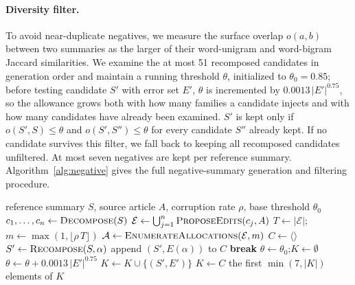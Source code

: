 \documentclass[11pt]{article}
\begin{document}
\paragraph{Diversity filter.}
To avoid near-duplicate negatives, we measure the surface overlap $o(a,b)$ between two summaries as the larger of their word-unigram and word-bigram Jaccard similarities. We examine the at most 51 recomposed candidates in generation order and maintain a running threshold $\theta$, initialized to $\theta_0=0.85$; before testing candidate $S'$ with error set $E'$, $\theta$ is incremented by $0.0013\,|E'|^{0.75}$, so the allowance grows both with how many families a candidate injects and with how many candidates have already been examined. $S'$ is kept only if $o(S',S)\le\theta$ and $o(S',S'')\le\theta$ for every candidate $S''$ already kept. If no candidate survives this filter, we fall back to keeping all recomposed candidates unfiltered. At most seven negatives are kept per reference summary. Algorithm~\ref{alg:negative} gives the full negative-summary generation and filtering procedure.

\begin{algorithm}[t]
\caption{Negative summary generation and diversity filtering}
\label{alg:negative}
\begin{algorithmic}[1]
\Require reference summary $S$, source article $A$, corruption rate $\rho$, base threshold $\theta_0$
\State $c_1,\dots,c_n \gets \textsc{Decompose}(S)$ 
\State $\mathcal{E} \gets \bigcup_{j=1}^{n} \textsc{ProposeEdits}(c_j, A)$ 
\State $T \gets |\mathcal{E}|$;\quad $m \gets \max(1, \lfloor \rho\, T \rfloor)$
\State $\mathcal{A} \gets \textsc{EnumerateAllocations}(\mathcal{E}, m)$ 
\State $C \gets \langle\rangle$ 
    \State $S' \gets \textsc{Recompose}(S, \alpha)$
    \State append $(S', E(\alpha))$ to $C$
        \State \textbf{break}
    \EndIf
\EndFor
\State $\theta \gets \theta_0$;\quad $K \gets \emptyset$ 
    \State $\theta \gets \theta + 0.0013\,|E'|^{0.75}$ 
        \State $K \gets K \cup \{(S', E')\}$
    \EndIf
\EndFor
{}
    \State $K \gets C$ 
\EndIf
\State \Return the first $\min(7, |K|)$ elements of $K$
\end{algorithmic}
\end{algorithm}
\end{document}
